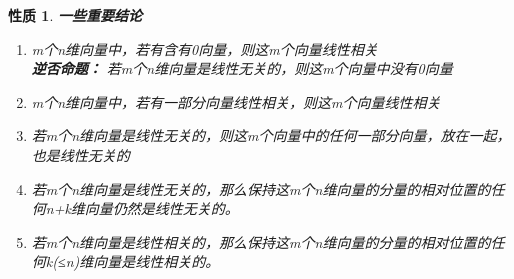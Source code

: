\documentclass[12pt,oneside]{ctexbook}
\newtheorem{property}[subsection]{性质}
\begin{document}
\begin{property}
    \textbf{一些重要结论}
    \begin{enumerate}
        \item m个n维向量中，若有含有0向量，则这m个向量线性相关 \\ \textbf{逆否命题：} 若m个n维向量是线性无关的，则这m个向量中没有0向量
        \item m个n维向量中，若有一部分向量线性相关，则这m个向量线性相关
        \item 若m个n维向量是线性无关的，则这m个向量中的任何一部分向量，放在一起，也是线性无关的
        \item 若m个n维向量是线性无关的，那么保持这m个n维向量的分量的相对位置的任何n+k维向量仍然是线性无关的。
        \item 若m个n维向量是线性相关的，那么保持这m个n维向量的分量的相对位置的任何k(≤n)维向量是线性相关的。
    \end{enumerate}
\end{property}
\end{document}
